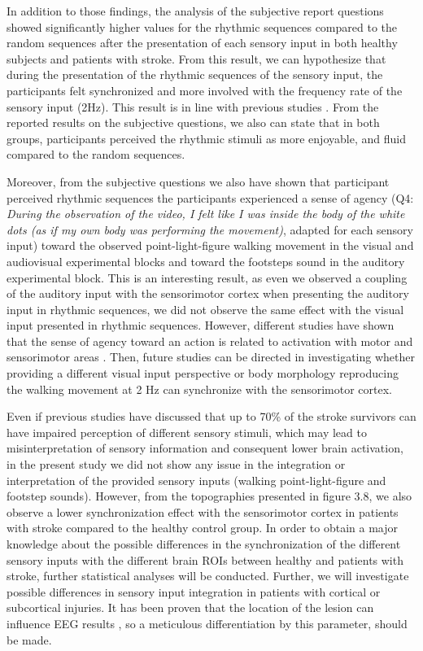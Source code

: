 In addition to those findings, the analysis of the subjective report questions showed significantly higher values for the rhythmic sequences compared to the random sequences after the presentation of each sensory input in both healthy subjects and patients with stroke. From this result, we can hypothesize that during the presentation of the rhythmic sequences of the sensory input, the participants felt synchronized and more involved with the frequency rate of the sensory input (2Hz). This result is in line with previous studies \parencite{Nozaradan_2016}. 
From the reported results on the subjective questions, we also can state that in both groups, participants perceived the rhythmic stimuli as more enjoyable, and fluid compared to the random sequences. 

Moreover, from the subjective questions we also have shown that participant perceived rhythmic sequences the participants experienced a sense of agency (Q4: \textit{During the observation of the video, I felt like I was inside the body of the white dots (as if my own body was performing the movement)}, adapted for each sensory input) toward the observed point-light-figure walking movement in the visual and audiovisual experimental blocks and toward the footsteps sound in the auditory experimental block. This is an interesting result, as even we observed a coupling of the auditory input with the sensorimotor cortex when presenting the auditory input in rhythmic sequences, we did not observe the same effect with the visual input presented in rhythmic sequences. However, different studies have shown that the sense of agency toward an action is related to activation with motor and sensorimotor areas \parencite{Buhrmann_2017,Longo_2009}. Then, future studies can be directed in investigating whether providing a different visual input perspective or body morphology reproducing the walking movement at 2 Hz can synchronize with the sensorimotor cortex. 

Even if previous studies have discussed that up to 70\% of the stroke survivors can have impaired perception of different sensory stimuli, which may lead to misinterpretation of sensory information \parencite{Hazelton_2022} and consequent lower brain activation, in the present study we did not show any issue in the integration or interpretation of the provided sensory inputs (walking point-light-figure and footstep sounds). However, from the topographies presented in figure 3.8, we also observe a lower synchronization effect with the sensorimotor cortex in patients with stroke compared to the healthy control group.
In order to obtain a major knowledge about the possible differences in the synchronization of the different sensory inputs with the different brain ROIs between healthy and patients with stroke, further statistical analyses will be conducted. Further, we will investigate possible differences in sensory input integration in patients with cortical or subcortical injuries. It has been proven that the location of the lesion can influence EEG results \parencite{Clark_2015}, so a meticulous differentiation by this parameter, should be made. 

